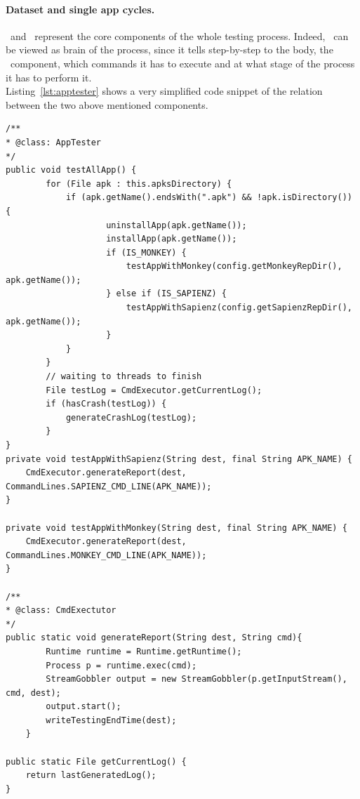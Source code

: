 \paragraph{Dataset and single app cycles. } 
\AppTester\ and \Cmd\ represent the core components of the whole testing process. Indeed, \AppTester\ can be viewed as brain of the process, since it tells step-by-step to the body, \ie the \Cmd\ component, which commands it has to execute and at what stage of the process it has to perform it. \\
Listing~\ref{lst:apptester} shows a very simplified code snippet of the relation between the two above mentioned components. 
\begin{lstlisting}[caption=Testing mechanism between \AppTester\ and \Cmd\, ,label={lst:apptester}]
/**
* @class: AppTester
*/
public void testAllApp() {
        for (File apk : this.apksDirectory) {
            if (apk.getName().endsWith(".apk") && !apk.isDirectory()) {
                    uninstallApp(apk.getName());
                    installApp(apk.getName());
                    if (IS_MONKEY) {
                        testAppWithMonkey(config.getMonkeyRepDir(), apk.getName());
                    } else if (IS_SAPIENZ) {
                        testAppWithSapienz(config.getSapienzRepDir(), apk.getName());
                    }
            }
        } 
        // waiting to threads to finish 
        File testLog = CmdExecutor.getCurrentLog();
        if (hasCrash(testLog)) {
            generateCrashLog(testLog);
        }
} 
private void testAppWithSapienz(String dest, final String APK_NAME) {
	CmdExecutor.generateReport(dest, CommandLines.SAPIENZ_CMD_LINE(APK_NAME)); 
}

private void testAppWithMonkey(String dest, final String APK_NAME) {
	CmdExecutor.generateReport(dest, CommandLines.MONKEY_CMD_LINE(APK_NAME)); 
}

/**
* @class: CmdExectutor
*/
public static void generateReport(String dest, String cmd){
        Runtime runtime = Runtime.getRuntime();
        Process p = runtime.exec(cmd);
        StreamGobbler output = new StreamGobbler(p.getInputStream(), cmd, dest); 
        output.start();
        writeTestingEndTime(dest);
    }
    
public static File getCurrentLog() {
    return lastGeneratedLog();
}
    
\end{lstlisting}


